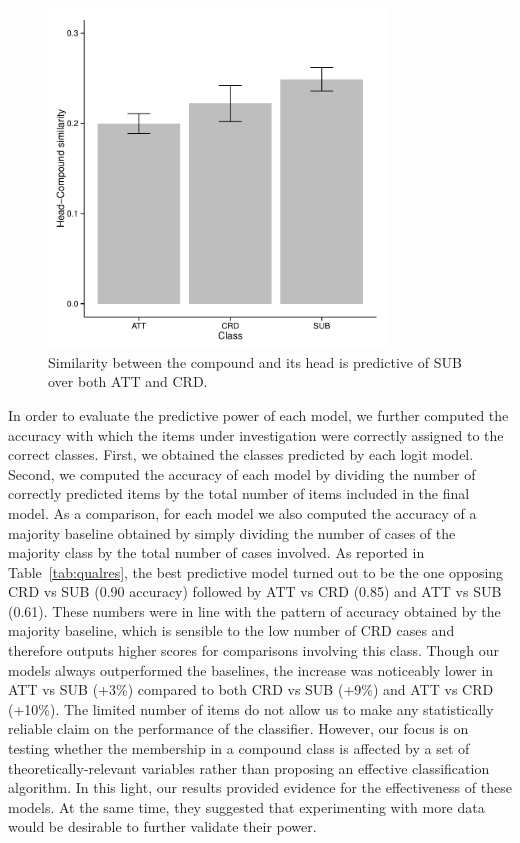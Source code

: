 \documentclass[output=paper]{langsci/langscibook}
\begin{document}
\begin{figure}
\begin{center}
\includegraphics[width=9cm]{figures/barplot2.pdf}
\caption{Similarity between the compound and its head is predictive of SUB over both ATT and CRD.}\label{fig:bar2}
\end{center}
\end{figure}


In order to evaluate the predictive power of each model, we further computed the accuracy with which the items under investigation were correctly assigned to the correct classes. First, we obtained the classes predicted by each logit model. Second, we computed the accuracy of each model by dividing the number of correctly predicted items by the total number of items included in the final model. As a comparison, for each model we also computed the accuracy of a majority baseline obtained by simply dividing the number of cases of the majority class by the total number of cases involved.  As reported in Table~\ref{tab:qualres}, the best predictive model turned out to be the one opposing CRD vs SUB (0.90 accuracy) followed by ATT vs CRD (0.85) and ATT vs SUB (0.61). These numbers were in line with the pattern of accuracy obtained by the majority baseline, which is sensible to the low number of CRD cases and therefore outputs higher scores for comparisons involving this class. Though our models always outperformed the baselines, the increase was noticeably lower in ATT vs SUB (+3\%) compared to both CRD vs SUB (+9\%) and ATT vs CRD (+10\%). The limited number of items do not allow us to make any statistically reliable claim on the performance of the classifier. However, our focus is on testing whether the membership in a compound class is affected by a set of theoretically-relevant variables rather than proposing an effective classification algorithm. In this light, our results provided evidence for the effectiveness of these models. At the same time, they suggested that experimenting with more data would be desirable to further validate their power.
\end{document}
